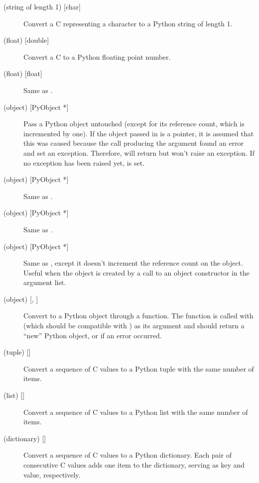 \documentclass{manual}
\begin{document}
\begin{description}
\item[ (string of length 1) {[char]}]
Convert a C  representing a character to a Python string of
length 1.

\item[ (float) {[double]}]
Convert a C  to a Python floating point number.

\item[ (float) {[float]}]
Same as .

\item[ (object) {[PyObject *]}]
Pass a Python object untouched (except for its reference count, which
is incremented by one).  If the object passed in is a \NULL{}
pointer, it is assumed that this was caused because the call producing
the argument found an error and set an exception.  Therefore,
 will return \NULL{} but won't raise an
exception.  If no exception has been raised yet,
 is set.

\item[ (object) {[PyObject *]}]
Same as .

\item[ (object) {[PyObject *]}]
Same as .

\item[ (object) {[PyObject *]}]
Same as , except it doesn't increment the reference count on
the object.  Useful when the object is created by a call to an object
constructor in the argument list.

\item[ (object) {[, ]}]
Convert  to a Python object through a 
function.  The function is called with  (which should be
compatible with ) as its argument and should return a
``new'' Python object, or \NULL{} if an error occurred.

\item[ (tuple) {[]}]
Convert a sequence of C values to a Python tuple with the same number
of items.

\item[ (list) {[]}]
Convert a sequence of C values to a Python list with the same number
of items.

\item[ (dictionary) {[]}]
Convert a sequence of C values to a Python dictionary.  Each pair of
consecutive C values adds one item to the dictionary, serving as key
and value, respectively.

\end{description}
\end{document}
